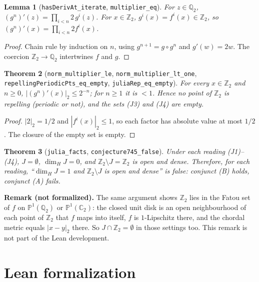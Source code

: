\documentclass[11pt]{article}
\newtheorem{theorem}{Theorem}
\newtheorem{lemma}[theorem]{Lemma}
\theoremstyle{definition}
\newcommand{\Zt}{\mathbb{Z}_2}
\newcommand{\Qt}{\mathbb{Q}_2}
\begin{document}
\begin{lemma}[\texttt{hasDerivAt\_iterate}, \texttt{multiplier\_eq}]
For $z\in\Qt$, $(g^{n})'(z)=\prod_{i<n}2\,g^{i}(z)$. For $x\in\Zt$, $g^{i}(x)=f^{i}(x)\in\Zt$, so
$(g^{n})'(x)=\prod_{i<n}2 f^{i}(x)$.
\end{lemma}
\begin{proof}
Chain rule by induction on $n$, using $g^{n+1}=g\circ g^{n}$ and $g'(w)=2w$. The coercion
$\Zt\to\Qt$ intertwines $f$ and $g$.
\end{proof}

\begin{theorem}[\texttt{norm\_multiplier\_le}, \texttt{norm\_multiplier\_lt\_one}, \texttt{repellingPeriodicPts\_eq\_empty}, \texttt{juliaRep\_eq\_empty}]
For every $x\in\Zt$ and $n\ge 0$, $|(g^{n})'(x)|_2\le 2^{-n}$; for $n\ge1$ it is $<1$. Hence no
point of $\Zt$ is repelling (periodic or not), and the sets (J3) and (J4) are empty.
\end{theorem}
\begin{proof}
$|2|_2=1/2$ and $|f^{i}(x)|_2\le1$, so each factor has absolute value at most $1/2$. The closure
of the empty set is empty.
\end{proof}

\begin{theorem}[\texttt{julia\_facts}, \texttt{conjecture745\_false}]
Under each reading (J1)--(J4), $J=\emptyset$, $\dim_H J=0$, and $\Zt\setminus J=\Zt$ is open and
dense. Therefore, for each reading, ``$\dim_H J=1$ and $\Zt\setminus J$ is open and dense'' is
false: conjunct (B) holds, conjunct (A) fails.
\end{theorem}

\textbf{Remark (not formalized).} The same argument shows $\Zt$ lies in the Fatou set of $f$ on
$\mathbb{P}^1(\Qt)$ or $\mathbb{P}^1(\mathbb{C}_2)$: the closed unit disk is an open neighbourhood
of each point of $\Zt$ that $f$ maps into itself, $f$ is $1$-Lipschitz there, and the chordal
metric equals $|x-y|_2$ there. So $J\cap\Zt=\emptyset$ in those settings too. This remark is not
part of the Lean development.

\section{Lean formalization}
\end{document}
